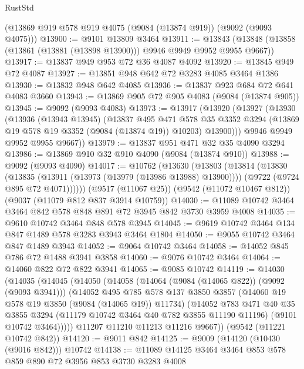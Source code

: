 \begin{lexlean}{RustStd}
\begin{coremodule}
    (@13869 @919 @578 @919 @4075 (@9084 (@13874 @919)) (@9092 (@9093 @4075)))
@13900 := @9101 @13809 @3464
@13911 := @13843 (@13848 (@13858 (@13861 (@13881 (@13898 @13900))) @9946 @9949 @9952 @9955 @9667))
@13917 := @13837 @949 @953 @72 @36 @4087 @4092
@13920 := @13845 @949 @72 @4087
@13927 := @13851 @948 @642 @72 @3283 @4085 @3464 @1386
@13930 := @13832 @948 @642 @4085
@13936 := @13837 @923 @684 @72 @641 @4083 @3660
@13943 := @13869 @905 @72 @905 @4083 (@9084 (@13874 @905))
@13945 := @9092 (@9093 @4083)
@13973 := @13917
    (@13920
      (@13927
        (@13930
          (@13936
            (@13943 @13945)
            (@13837
              @495
              @471
              @578
              @35
              @3352
              @3294
              (@13869 @19 @578 @19 @3352 (@9084 (@13874 @19)) @10203)
              @13900)))
        @9946
        @9949
        @9952
        @9955
        @9667))
@13979 := @13837 @951 @471 @32 @35 @4090 @3294
@13986 := @13869 @910 @32 @910 @4090 (@9084 (@13874 @910))
@13988 := @9092 (@9093 @4090)
@14017 := @10762
    (@13630
      (@13803
        (@13814
          (@13830
            (@13835 (@13911 (@13973 (@13979 (@13986 @13988) @13900))))
            (@9722 (@9724 @895 @72 @4071))))))
    (@9517 (@11067 @25))
    (@9542 (@11072 @10467 @812))
    (@9037 (@11079 @812 @837 @3914 @10759))
@14030 := @11089 @10742 @3464 @3464 @842 @578 @848 @891 @72 @3945 @842 @3730 @3959 @4008
@14035 := @9610 @10742 @3464 @848 @578 @3945
@14045 := @9619 @10742 @3464 @134 @847 @1489 @578 @3283 @3943 @3464 @1804
@14050 := @9055 @10742 @3464 @847 @1489 @3943
@14052 := @9064 @10742 @3464
@14058 := @14052 @845 @786 @72 @1488 @3941 @3858
@14060 := @9076 @10742 @3464
@14064 := @14060 @822 @72 @822 @3941
@14065 := @9085 @10742
@14119 := @14030
    (@14035
      (@14045
        (@14050
          (@14058
            (@14064 (@9084 (@14065 @822)) (@9092 (@9093 @3941)))
            (@14052
              @495
              @785
              @578
              @137
              @3850
              @3857
              (@14060 @19 @578 @19 @3850 (@9084 (@14065 @19)) @11734)
              (@14052
                @783
                @471
                @40
                @35
                @3855
                @3294
                (@11179 @10742 @3464 @40 @782 @3855 @11190 @11196)
                (@9101 @10742 @3464)))))
        @11207
        @11210
        @11213
        @11216
        @9667))
    (@9542 (@11221 @10742 @842))
@14120 := @9011 @842
@14125 := @9009 (@14120 (@10430 (@9016 @842))) @10742
@14138 := @11089 @14125 @3464 @3464 @853 @578 @859 @890 @72 @3956 @853 @3730 @3283 @4008

\end{coremodule}
\end{lexlean}
